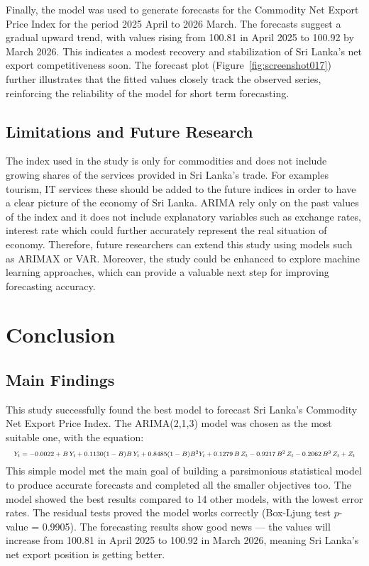 \documentclass[12pt,a4paper]{report} %
\begin{document}
		Finally, the model was used to generate forecasts for the Commodity Net Export Price Index for the period 2025 April to 2026 March. The forecasts suggest a gradual upward trend, with values rising from 100.81 in April 2025 to 100.92 by March 2026. This indicates a modest recovery and stabilization of Sri Lanka’s net export competitiveness soon. The forecast plot (Figure~\ref{fig:screenshot017}) further illustrates that the fitted values closely track the observed series, reinforcing the reliability of the model for short term forecasting.
		
		\section{Limitations and Future Research}
		The index used in the study is only for commodities and does not include growing shares of the services provided in Sri Lanka’s trade. For examples tourism, IT services these should be added to the future indices in order to have a clear picture of the economy of Sri Lanka. ARIMA rely only on the past values of the index and it does not include explanatory variables such as exchange rates, interest rate which could further accurately represent the real situation of economy. Therefore, future researchers can extend this study using models such as ARIMAX or VAR. Moreover, the study could be enhanced to explore machine learning approaches, which can provide a valuable next step for improving forecasting accuracy.
		
		\setcounter{chapter}{6}
		
			\chapter{Conclusion}
		
		\section{Main Findings}
		This study successfully found the best model to forecast Sri Lanka's Commodity Net Export Price Index. 
		The ARIMA(2,1,3) model was chosen as the most suitable one, with the equation: 
		\[
		\resizebox{\textwidth}{!}{$
		Y_t = -0.0022 + B\,Y_{t} + 0.1130(1-B)B\,Y_{t} + 0.8485(1-B)B^{2}Y_{t}
		+ 0.1279\,B\,Z_{t} - 0.9217\,B^2\,Z_{t} - 0.2062\,B^3\,Z_{t} + Z_t
		$}
		\]
		This simple model met the main goal of building a parsimonious statistical model to produce accurate forecasts and completed all the smaller objectives too. 
		The model showed the best results compared to 14 other models, with the lowest error rates. 
		The residual tests proved the model works correctly (Box-Ljung test $p$-value = 0.9905). 
		The forecasting results show good news --- the values will increase from 100.81 in April 2025 to 100.92 in March 2026, meaning Sri Lanka's net export position is getting better.
		
\end{document}
